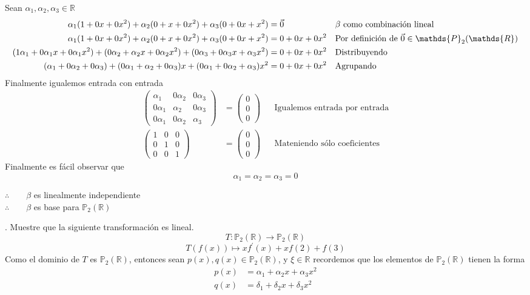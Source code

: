 \documentclass[letterpaper]{article}
\newcommand{\R}{\mathds{R}}
\newcommand{\Po}{\mathds{P}_2(\mathds{R})}
\renewcommand{\*}{\cdot}
\newcommand{\Iden}{\begin{pmatrix}
		1 & 0 & 0\\
		0 & 1 & 0\\
		0 & 0 & 1 
\end{pmatrix}}
\theoremstyle{definition}
\begin{document}
Sean $ \alpha_1, \alpha_2, \alpha_3 \in \R $ 
\begin{align*}
	\alpha_1(1 + 0x + 0x^2) + \alpha_2(0 + x + 0x^2) + \alpha_3(0 + 0x + x^2) &= \vec{0} && \text{$ \beta $ como combinación lineal}\\
	\alpha_1(1 + 0x + 0x^2) + \alpha_2(0 + x + 0x^2) + \alpha_3(0 + 0x + x^2) &= 0 + 0x + 0x^2 && \text{Por definición de $ \vec{0} \in \Po $}\\
	(1\alpha_1 + 0\alpha_1x + 0\alpha_1x^2) + (0\alpha_2 + \alpha_2x + 0\alpha_2x^2) + (0\alpha_3 + 0\alpha_3x + \alpha_3x^2) &= 0 + 0x + 0x^2  && \text{Distribuyendo}\\
	(\alpha_1 + 0\alpha_2 + 0\alpha_3) + (0\alpha_1 + \alpha_2 + 0\alpha_3)x + (0\alpha_1 + 0\alpha_2 + \alpha_3)x^2 &= 0 + 0x + 0x^2 && \text{Agrupando}
\end{align*}
Finalmente igualemos entrada con entrada
\begin{align*}
	\begin{pmatrix}
	\alpha_1 & 0\alpha_2 & 0\alpha_3\\
	0\alpha_1 & \alpha_2 & 0\alpha_3\\
	0\alpha_1 & 0\alpha_2 & \alpha_3 
	\end{pmatrix} 
	& = \begin{pmatrix}
	0\\
	0\\
	0
	\end{pmatrix} && \text{Igualemos entrada por entrada}\\
	\Iden & = \begin{pmatrix}
	0\\
	0\\
	0
	\end{pmatrix} && \text{Mateniendo sólo coeficientes}
\end{align*}
Finalmente es fácil observar que 
\[ \alpha_1 = \alpha_2 = \alpha_3 = 0  \]
\begin{center}
	$ \therefore \qquad \beta$ es linealmente independiente\\
	$ \therefore \qquad \beta$ es base para $ \Po $
\end{center}
. Muestre que la siguiente transformación es lineal.
 $$    T \colon  \mathbb{P}_{2}(\mathbb{R})  \longrightarrow \mathbb{P}_{2}(\mathbb{R}) $$
	$$ T(f(x)) \mapsto  xf^{'}(x) +x f(2) + f(3)$$
Como el dominio de $ T $ es $ \Po $, entonces sean $ p(x), q(x) \in \Po $, y $ \xi \in \R $ recordemos que los elementos de $ \Po $ tienen la forma
\begin{align*}
	p(x) & =\alpha_1 + \alpha_2x + \alpha_3x^2\\
	q(x) & =\delta_1 + \delta_2x + \delta_3x^2
\end{align*}
\end{document}
